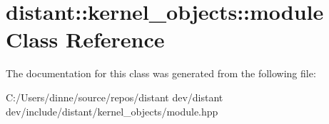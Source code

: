 \hypertarget{classdistant_1_1kernel__objects_1_1module}{}\section{distant\+:\+:kernel\+\_\+objects\+:\+:module Class Reference}
\label{classdistant_1_1kernel__objects_1_1module}


The documentation for this class was generated from the following file\+:\begin{DoxyCompactItemize}
\item 
C\+:/\+Users/dinne/source/repos/distant dev/distant dev/include/distant/kernel\+\_\+objects/module.\+hpp\end{DoxyCompactItemize}
